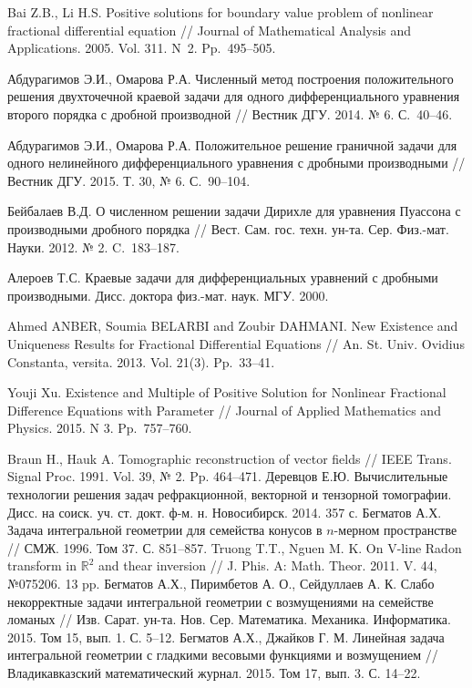 \begin{thebibliography}{1}
{Bai Z.B., Li H.S.} Positive solutions for boundary  value
problem of nonlinear fractional differential equation // Journal
of  Mathematical  Analysis and Applications. 2005. Vol. 311. N~2. Pp.~495--505.

{Абдурагимов Э.И., Омарова Р.А.} Численный метод построения
положительного решения двухточечной краевой задачи для одного
дифференциального уравнения второго порядка с дробной
производной // Вестник ДГУ. 2014. № 6. С.~40--46.

{Абдурагимов Э.И., Омарова Р.А.} Положительное решение граничной
задачи для одного нелинейного дифференциального уравнения  с
дробными производными // Вестник ДГУ. 2015. Т. 30, № 6. С.~90--104.

{Бейбалаев В.Д.} О численном решении задачи Дирихле для уравнения
Пуассона с производными дробного порядка // Вест. Сам. гос.
техн. ун-та. Сер. Физ.-мат. Науки. 2012. № 2. C.~183--187.

{Алероев Т.С.} Краевые задачи для дифференциальных уравнений с
дробными производными. Дисс. доктора физ.-мат. наук. МГУ. 2000.

{Ahmed ANBER, Soumia BELARBI and Zoubir DAHMANI.}  New Existence and
Uniqueness Results for Fractional Differential Equations // An.
St. Univ. Ovidius Constanta, versita. 2013. Vol. 21(3). Pp.~33--41.

{Youji Xu.} Existence and Multiple of  Positive Solution for
Nonlinear Fractional Difference Equations with Parameter // Journal of Applied Mathematics and Physics. 2015. N 3. Pp.~757--760.

 Braun H., Hauk A. Tomographic reconstruction of vector fields // IEEE Trans. Signal Proc. 1991. Vol. 39, № 2. Pp. 464--471.
 Деревцов Е.Ю. Вычислительные технологии решения задач рефракционной, векторной и тензорной томографии. Дисс. на соиск. уч. ст. докт. ф-м. н. Новосибирск. 2014. 357 с.
 Бегматов А.Х. Задача интегральной геометрии для семейства конусов в $n$-мерном пространстве // СМЖ. 1996. Том 37. С. 851--857.
 Truong T.T., Nguen M. K. On V-line Radon transform in $\mathbb R^2$ and thear inversion //  J. Phis. A: Math. Theor. 2011. V. 44, №075206. 13 pp.
 Бегматов А.Х., Пиримбетов А. О., Сейдуллаев А. К. Слабо некорректные задачи интегральной геометрии с возмущениями на семействе ломаных //  Изв. Сарат. ун-та. Нов. Сер. Математика. Механика. Информатика. 2015. Том 15, вып. 1. С. 5--12.
 Бегматов А.Х., Джайков Г. М. Линейная задача интегральной геометрии с гладкими весовыми функциями и возмущением //  Владикавказский математический журнал.  2015.  Том 17, вып. 3. С. 14--22.





\end{thebibliography}
